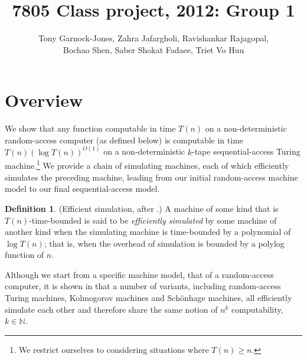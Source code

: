 \documentclass[english]{article}
\theoremstyle{plain}
\theoremstyle{definition}
\newtheorem{defn}[thm]{Definition}
\theoremstyle{plain}
\begin{document}
\title{7805 Class project, 2012: Group 1}
\author{
  Tony Garnock-Jones,
  Zahra Jafargholi,
  Ravishankar Rajagopal,\\
  Bochao Shen,
  Saber Shokat Fadaee,
  Triet Vo Huu
}
\maketitle

\section{Overview}

We show that any function computable in time $T(n)$ on a
non-deterministic random-access computer (as defined below) is
computable in time $T(n)(\log T(n))^{O(1)}$ on a non-deterministic
$k$-tape sequential-access Turing machine.\footnote{We restrict
  ourselves to considering situations where $T(n) \geq n$.} We provide
a chain of simulating machines, each of which efficiently simulates
the preceding machine, leading from our initial random-access machine
model to our final sequential-access model.

\begin{defn}

  (Efficient simulation, after \cite{DBLP:conf/ershov/GurevichS89}.) A
  machine of some kind that is $T(n)$-time-bounded is said to be
  \emph{efficiently simulated} by some machine of another kind when
  the simulating machine is time-bounded by a polynomial of $\log
  T(n)$; that is, when the overhead of simulation is bounded by a
  polylog function of $n$.
\end{defn}

Although we start from a specific machine model, that of a
random-access computer, it is shown in
\cite{DBLP:conf/ershov/GurevichS89} that a number of variants,
including random-access Turing machines, Kolmogorov machines and
Sch\"{o}nhage machines, all efficiently simulate each other and
therefore share the same notion of $n^k$ computability,
$k\in\mathbb{N}$.
\end{document}
